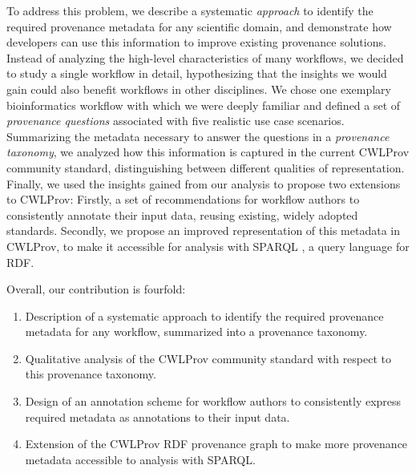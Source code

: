 To address this problem, we describe a systematic \emph{approach} to identify the required provenance metadata for any scientific domain, and demonstrate how developers can use this information to improve existing provenance solutions. Instead of analyzing the high-level characteristics of many workflows, we decided to study a single workflow in detail, hypothesizing that the insights we would gain could also benefit workflows in other disciplines. 
We chose one exemplary bioinformatics workflow with which we were deeply familiar and defined a set of \emph{provenance questions} associated with five realistic use case scenarios. Summarizing the metadata necessary to answer the questions in a \emph{provenance taxonomy}, we analyzed how this information is captured in the current CWLProv community standard, distinguishing between different qualities of representation. Finally, we used the insights gained from our analysis to propose two extensions to CWLProv: Firstly, a set of recommendations for workflow authors to consistently annotate their input data, reusing existing, widely adopted standards. Secondly, we propose an improved representation of this metadata in CWLProv, to make it accessible for analysis with SPARQL \cite{thew3csparqlworkinggroupSPARQLOverview2013}, a query language for RDF.


Overall, our contribution is fourfold:
\begin{enumerate}
    \item Description of a systematic approach to identify the required provenance metadata for any workflow, summarized into a provenance taxonomy.
    \item Qualitative analysis of the CWLProv community standard with respect to this provenance taxonomy.
    \item Design of an annotation scheme for workflow authors to consistently express required metadata as annotations to their input data.
    \item Extension of the CWLProv RDF provenance graph to make more provenance metadata accessible to analysis with SPARQL.
\end{enumerate}

